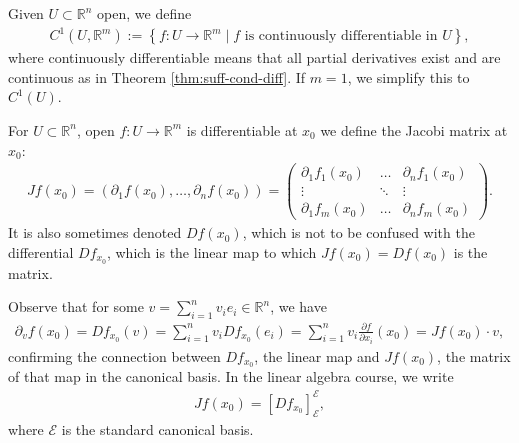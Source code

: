 
\begin{definition}[$C_{1}$-functions]\label{def:c1-func}
	Given $U \subset \mathbb{R}^{n}$ open, we define
	\begin{align*}
		C^{1}(U, \mathbb{R}^{m}) := \left\{ f: U \to \mathbb{R}^{m} \mid f \text{ is continuously differentiable in } U \right\},
	\end{align*}
	where continuously differentiable means that all partial derivatives exist and are continuous as in Theorem \ref{thm:suff-cond-diff}. If $m = 1$, we simplify this to $C^{1}(U)$.
\end{definition}

\begin{definition}\label{def:jabocian-matrix}
	For $U \subset \mathbb{R}^{n}$, open $f: U \to \mathbb{R}^{m}$ is differentiable at $x_{0}$ we define the Jacobi matrix at $x_{0}$:
	\begin{align*}
		Jf(x_{0}) = (\partial_{1}f(x_{0}), \dots, \partial_{n}f(x_{0})) =
		\begin{pmatrix}
			\partial_{1}f_{1}(x_{0}) & \dots  & \partial_{n}f_{1}(x_{0}) \\
			\vdots                   & \ddots & \vdots                   \\
			\partial_{1}f_{m}(x_{0}) & \dots  & \partial_{n}f_{m}(x_{0})
		\end{pmatrix}.
	\end{align*}
	It is also sometimes denoted $Df(x_{0})$, which is not to be confused with the differential $Df_{x_{0}}$, which is the linear map to which $Jf(x_{0}) = Df(x_{0})$ is the matrix.
\end{definition}

\begin{remark}
	Observe that for some $v = \sum_{i=1}^{n} v_{i}e_{i} \in \mathbb{R}^{n}$, we have
	\begin{align*}
		\partial_{v}f(x_{0}) = Df_{x_{0}}(v) = \sum_{i=1}^{n} v_{i} Df_{x_{0}}(e_{i}) = \sum_{i=1}^{n} v_{i} \frac{\partial f}{\partial x_{i}}(x_{0}) = Jf(x_{0}) \cdot v,
	\end{align*}
	confirming the connection between $Df_{x_{0}}$, the linear map and $Jf(x_{0})$, the matrix of that map in the canonical basis. In the linear algebra course, we write
	\begin{align*}
		Jf(x_{0}) = [Df_{x_{0}}]_{\mathcal{E}}^{\mathcal{E}},
	\end{align*}
	where $\mathcal{E}$ is the standard canonical basis.
\end{remark}

